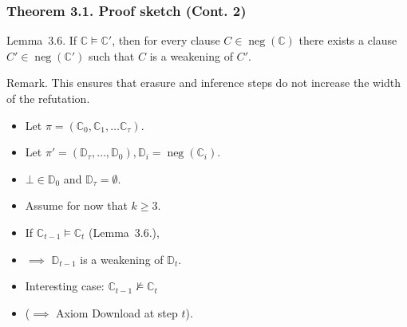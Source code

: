 \documentclass[t,usenames,dvipsnames]{beamer}
\newcommand {\nconf}[1]{\operatorname{neg}({#1})}
\begin{document}
\begin{frame}\frametitle{Theorem 3.1. Proof sketch (Cont. 2)}
	\begin{block}{Lemma~3.6.}
		If $\mathbb{C} \models \mathbb{C}'$, then for every clause $C \in
		\nconf{\mathbb{C}}$ there exists a clause $C' \in \nconf{\mathbb{C}'}$ such that $C$
		is a weakening of $C'$.
	\end{block}
	Remark. This ensures that erasure and inference steps do not increase the width of the
	refutation.
	\pause
	\begin{itemize}[<+->]
		\item Let $\pi = (\mathbb{C}_0, \mathbb{C}_1, \dots \mathbb{C}_{\tau})$.
		\item Let $\pi' = (\mathbb{D}_{\tau}, \dots, \mathbb{D}_0), \mathbb{D}_i =
			\nconf{\mathbb{C}_i}$.
		\item $\bot \in \mathbb{D}_0$ and $\mathbb{D}_{\tau} = \emptyset$.
		\item {\color{red}Assume} for now that $k \geq 3$.
		\item If $\mathbb{C}_{t-1} \models \mathbb{C}_{t}$ (Lemma~3.6.),
		\item[] \hspace{.5cm} $\implies$  $\mathbb{D}_{t-1}$ is a weakening of $\mathbb{D}_t$.
		\item Interesting case: $\mathbb{C}_{t-1} \not \models \mathbb{C}_{t}$
		\item[] \hspace{.5cm} ($\implies$ Axiom Download at step $t$).
	\end{itemize}
\end{frame}
\end{document}
